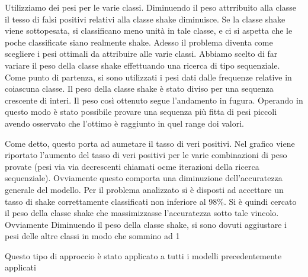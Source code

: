 \documentclass{report}
\begin{document}
%
Utilizziamo dei pesi per le varie classi. Diminuendo il peso attrribuito alla classe il tesso di falsi positivi relativi alla classe shake diminuisce.
Se la classe shake viene sottopesata, si classificano meno unità in tale classe, e ci si aspetta che le poche classificate siano realmente shake. 
Adesso il problema diventa come scegliere i pesi ottimali da attribuire alle varie classi. Abbiamo scelto di far variare il peso della classe shake effettuando una ricerca di tipo sequenziale. Come punto di partenza, si sono utilizzati i pesi dati dalle frequenze relative in coiascuna classe. Il peso della classe shake è stato diviso per una sequenza crescente di interi. Il peso così ottenuto segue l\rq{}andamento in fugura. Operando in questo modo è stato possibile provare una sequenza più fitta di pesi piccoli avendo osservato che l\rq{}ottimo è raggiunto in quel range doi valori.
%

%
Come detto, questo porta ad aumetare il tasso di veri positivi. Nel grafico viene riportato l\rq{}aumento del tasso di veri positivi per le varie combinazioni di peso provate (pesi via via decrescenti chiamati ocme iterazioni della ricerca sequenziale).
Ovviamente questo comporta una diminuzione dell\rq{}accuratezza generale del modello. Per il problema analizzato si è disposti ad accettare un tasso di shake correttamente classificati non inferiore al 98\%. Si è quindi cercato il peso della classe shake che massimizzasse l\rq{}accuratezza sotto tale vincolo.
Ovviamente Diminuendo il peso della classe shake, si sono dovuti aggiustare i pesi delle altre classi in modo che sommino ad 1
%

%
Questo tipo di approccio è stato applicato a tutti i modelli precedentemente applicati
\end{document}
